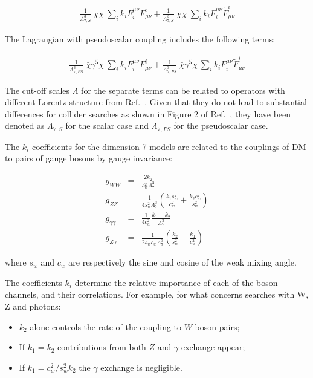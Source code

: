 \begin{eqnarray}
\frac{1}{\Lambda_{7,S}^3} ~\bar{\chi} \chi ~ \sum_i k_i  F_i^{\mu \nu} F^i_{\mu \nu} + 
\frac{1}{\Lambda_{7,S}^3} ~\bar{\chi} \chi ~ \sum_i k_i  F_i^{\mu \nu} \tilde F^i_{\mu \nu}
\end{eqnarray}

The Lagrangian with pseudoscalar coupling includes the following terms:

\begin{eqnarray}
\frac{1}{\Lambda_{7,PS}^3} ~\bar{\chi} \gamma^5 \chi ~ \sum_i k_i  F_i^{\mu \nu} F^i_{\mu \nu} +
\frac{1}{\Lambda_{7,PS}^3} ~\bar{\chi} \gamma^5 \chi ~ \sum_i k_i  F_i^{\mu \nu} \tilde F^i_{\mu \nu}
\end{eqnarray}

The cut-off scales $\Lambda$ for the separate terms can be related to operators with different 
Lorentz structure from Ref.~\cite{Cotta:2012nj}. Given that they do not lead to 
substantial differences for collider searches as shown in Figure 2 of Ref.~\cite{Carpenter:2012rg}, 
they have been denoted as $\Lambda_{7,S}$ for the scalar case and  $\Lambda_{7,PS}$ for the pseudoscalar
case. 

The $k_i$ coefficients for the dimension 7 models are related to the couplings of DM to pairs of gauge 
bosons by gauge invariance: 

\begin{eqnarray}
g_{WW}&=&\frac{2k_2}{s_w^2 \Lambda_7^3} \\
g_{ZZ} &=& \frac{1}{4 s_w^2 \Lambda_7^3} \left(\frac{k_1 s_w^2}{c_w^2}+\frac{k_2 c_w^2}{s_w^2} \right) \\
g_{\gamma\gamma}&=&\frac{1}{4 c_w^2}\frac{k_1+k_2}{\Lambda_7^3} \\
g_{Z\gamma} &=& \frac{1}{2 s_w c_w \Lambda_7^3} \left(\frac{k_2}{s_w^2}-\frac{k_1}{c_w^2} \right)
\label{eq:prefactors}
\end{eqnarray}

where $s_w$ and $c_w$ are respectively the sine and cosine of the weak mixing angle. 

The coefficients $k_i$ determine the relative importance of each of the boson channels,
and their correlations. For example, for what concerns searches with W, Z and photons: 
\begin{itemize}
 \item $k_2$ alone controls the rate of the coupling to $W$ boson pairs;
 \item If $k_1 = k_2$ contributions from both $Z$ and $\gamma$ exchange appear;
 \item If $k_1 = c_w^2 / s_w^2 k_2$ the $\gamma$ exchange is negligible. 
\end{itemize}

